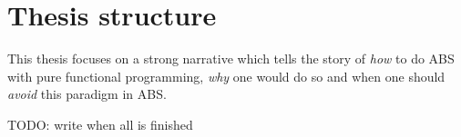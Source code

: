 \newpage

\section{Thesis structure}
This thesis focuses on a strong narrative which tells the story of \textit{how} to do ABS with pure functional programming, \textit{why} one would do so and when one should \textit{avoid} this paradigm in ABS.

TODO: write when all is finished